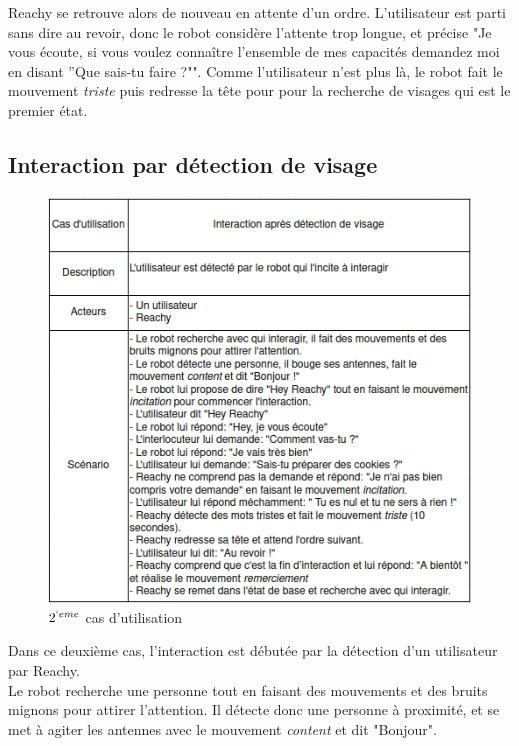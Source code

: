 Reachy se retrouve alors de nouveau en attente d'un ordre. L'utilisateur est parti sans dire au revoir, donc le robot considère l'attente trop longue, et précise "Je vous écoute, si vous voulez connaître l’ensemble de mes capacités demandez moi en disant ”Que sais-tu faire ?"". Comme l'utilisateur n'est plus là, le robot fait le mouvement \textit{triste} puis redresse la tête pour pour la recherche de visages qui est le premier état.

\subsection{Interaction par détection de visage}
\begin{figure}[!ht]
    \begin{center}
        \includegraphics[scale = 0.62]{use_case2.png}
        \caption{$2^{`eme}$ cas d'utilisation}
    \end{center}
\end{figure}
Dans ce deuxième cas, l'interaction est débutée par la détection d'un utilisateur par Reachy. \\

Le robot recherche une personne tout en faisant des mouvements et des bruits mignons pour attirer l'attention. Il détecte donc une personne à proximité, et se met à agiter les antennes avec le mouvement \textit{content} et dit "Bonjour". \\


